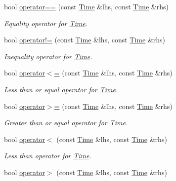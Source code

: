 \begin{DoxyCompactItemize}
\item 
bool \hyperlink{classns3_1_1Time_a6b159917b40f8b6f167d401b31cfc256}{operator==} (const \hyperlink{classns3_1_1Time}{Time} \&lhs, const \hyperlink{classns3_1_1Time}{Time} \&rhs)
\begin{DoxyCompactList}\small\item\em Equality operator for \hyperlink{classns3_1_1Time}{Time}. \end{DoxyCompactList}\item 
bool \hyperlink{classns3_1_1Time_ab49047058d7dbceb1859f0e5744c79e9}{operator!=} (const \hyperlink{classns3_1_1Time}{Time} \&lhs, const \hyperlink{classns3_1_1Time}{Time} \&rhs)
\begin{DoxyCompactList}\small\item\em Inequality operator for \hyperlink{classns3_1_1Time}{Time}. \end{DoxyCompactList}\item 
bool \hyperlink{classns3_1_1Time_a9b1ed94af7bae2d31af11bcafc7fa4e4}{operator$<$=} (const \hyperlink{classns3_1_1Time}{Time} \&lhs, const \hyperlink{classns3_1_1Time}{Time} \&rhs)
\begin{DoxyCompactList}\small\item\em Less than or equal operator for \hyperlink{classns3_1_1Time}{Time}. \end{DoxyCompactList}\item 
bool \hyperlink{classns3_1_1Time_a8c3d1c08ab60d159a2026f9c193ca748}{operator$>$=} (const \hyperlink{classns3_1_1Time}{Time} \&lhs, const \hyperlink{classns3_1_1Time}{Time} \&rhs)
\begin{DoxyCompactList}\small\item\em Greater than or equal operator for \hyperlink{classns3_1_1Time}{Time}. \end{DoxyCompactList}\item 
bool \hyperlink{classns3_1_1Time_ab1ed2ae785e0885a6b8a2541808e7a28}{operator$<$} (const \hyperlink{classns3_1_1Time}{Time} \&lhs, const \hyperlink{classns3_1_1Time}{Time} \&rhs)
\begin{DoxyCompactList}\small\item\em Less than operator for \hyperlink{classns3_1_1Time}{Time}. \end{DoxyCompactList}\item 
bool \hyperlink{classns3_1_1Time_addcc2fb274ebc2172b8423213c9e6570}{operator$>$} (const \hyperlink{classns3_1_1Time}{Time} \&lhs, const \hyperlink{classns3_1_1Time}{Time} \&rhs)

\end{DoxyCompactItemize}
